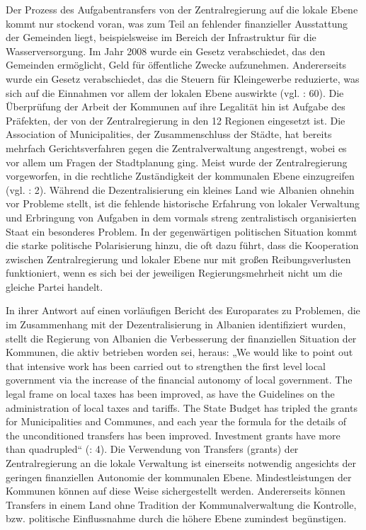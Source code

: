 Der Prozess des Aufgabentransfers von der Zentralregierung auf die lokale Ebene kommt nur stockend voran, was zum Teil an fehlender finanzieller Ausstattung der Gemeinden liegt, beispielsweise im Bereich der Infrastruktur für die Wasserversorgung. Im Jahr 2008 wurde ein Gesetz verabschiedet, das den Gemeinden ermöglicht, Geld für öffentliche Zwecke aufzunehmen. Andererseits wurde ein Gesetz verabschiedet, das die Steuern für Kleingewerbe reduzierte, was sich auf die Einnahmen vor allem der lokalen Ebene auswirkte (vgl. \cite{refworld10}: 60). Die Überprüfung der Arbeit der Kommunen auf ihre Legalität hin ist Aufgabe des Präfekten, der von der Zentralregierung in den 12 Regionen eingesetzt ist. Die Association of Municipalities, der Zusammenschluss der Städte, hat bereits mehrfach Gerichtsverfahren gegen die Zentralverwaltung angestrengt, wobei es vor allem um Fragen der Stadtplanung ging. Meist wurde der Zentralregierung vorgeworfen, in die rechtliche Zuständigkeit der kommunalen Ebene einzugreifen (vgl. \cite{oecd08a}: 2). Während die Dezentralisierung ein kleines Land wie Albanien ohnehin vor Probleme stellt, ist die fehlende historische Erfahrung von lokaler Verwaltung und Erbringung von Aufgaben in dem vormals streng zentralistisch organisierten Staat ein besonderes Problem. In der gegenwärtigen politischen Situation kommt die starke politische Polarisierung hinzu, die oft dazu führt, dass die Kooperation zwischen Zentralregierung und lokaler Ebene nur mit großen Reibungsverlusten funktioniert, wenn es sich bei der jeweiligen Regierungsmehrheit nicht um die gleiche Partei handelt.\par
In ihrer Antwort auf einen vorläufigen Bericht des Europarates zu Problemen, die im Zusammenhang mit der Dezentralisierung in Albanien identifiziert wurden, stellt die Regierung von Albanien die Verbesserung der finanziellen Situation der Kommunen, die aktiv betrieben worden sei, heraus: „We would like to point out that intensive work has been carried out to strengthen the first level local government via the increase of the financial autonomy of local government. The legal frame on local taxes has been improved, as have the Guidelines on the administration of local taxes and tariffs. The State Budget has tripled the grants for Municipalities and Communes, and each year the formula for the details of the unconditioned transfers has been improved. Investment grants have more than quadrupled“ (\cite{govalb09}: 4). Die Verwendung von Transfers (grants) der Zentralregierung an die lokale Verwaltung ist einerseits notwendig angesichts der geringen finanziellen Autonomie der kommunalen Ebene. Mindestleistungen der Kommunen können auf diese Weise sichergestellt werden. Andererseits können Transfers in einem Land ohne Tradition der Kommunalverwaltung die Kontrolle, bzw. politische Einflussnahme durch die höhere Ebene zumindest begünstigen. \par 
